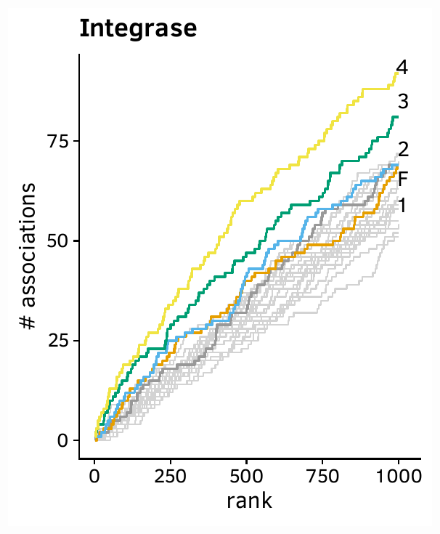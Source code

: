 \documentclass[a4paper,11pt]{article}
\begin{document}
\begin{figure}[H]
\begin{minipage}{.40\textwidth}
      \includegraphics[width=\linewidth]{plots/comparison_plots/hiv_china/integrase_new_map.pdf}
    \end{minipage}
  
    \vspace{0.5cm}
  

\end{figure}
\end{document}
